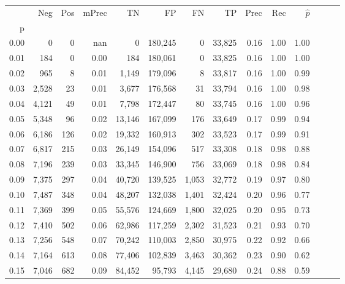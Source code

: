 \begin{tabular}{rrrrrrrrrrrrrr}
\toprule
{} &    Neg &  Pos & mPrec &       TN &       FP &      FN &      TP &  Prec &   Rec & $\hat{p}$ \\
p    &        &      &       &          &          &         &         &       &       &           \\
\midrule
0.00 &      0 &    0 &   nan &        0 &  180,245 &       0 &  33,825 &  0.16 &  1.00 &      1.00 \\
0.01 &    184 &    0 &  0.00 &      184 &  180,061 &       0 &  33,825 &  0.16 &  1.00 &      1.00 \\
0.02 &    965 &    8 &  0.01 &    1,149 &  179,096 &       8 &  33,817 &  0.16 &  1.00 &      0.99 \\
0.03 &  2,528 &   23 &  0.01 &    3,677 &  176,568 &      31 &  33,794 &  0.16 &  1.00 &      0.98 \\
0.04 &  4,121 &   49 &  0.01 &    7,798 &  172,447 &      80 &  33,745 &  0.16 &  1.00 &      0.96 \\
0.05 &  5,348 &   96 &  0.02 &   13,146 &  167,099 &     176 &  33,649 &  0.17 &  0.99 &      0.94 \\
0.06 &  6,186 &  126 &  0.02 &   19,332 &  160,913 &     302 &  33,523 &  0.17 &  0.99 &      0.91 \\
0.07 &  6,817 &  215 &  0.03 &   26,149 &  154,096 &     517 &  33,308 &  0.18 &  0.98 &      0.88 \\
0.08 &  7,196 &  239 &  0.03 &   33,345 &  146,900 &     756 &  33,069 &  0.18 &  0.98 &      0.84 \\
0.09 &  7,375 &  297 &  0.04 &   40,720 &  139,525 &   1,053 &  32,772 &  0.19 &  0.97 &      0.80 \\
0.10 &  7,487 &  348 &  0.04 &   48,207 &  132,038 &   1,401 &  32,424 &  0.20 &  0.96 &      0.77 \\
0.11 &  7,369 &  399 &  0.05 &   55,576 &  124,669 &   1,800 &  32,025 &  0.20 &  0.95 &      0.73 \\
0.12 &  7,410 &  502 &  0.06 &   62,986 &  117,259 &   2,302 &  31,523 &  0.21 &  0.93 &      0.70 \\
0.13 &  7,256 &  548 &  0.07 &   70,242 &  110,003 &   2,850 &  30,975 &  0.22 &  0.92 &      0.66 \\
0.14 &  7,164 &  613 &  0.08 &   77,406 &  102,839 &   3,463 &  30,362 &  0.23 &  0.90 &      0.62 \\
0.15 &  7,046 &  682 &  0.09 &   84,452 &   95,793 &   4,145 &  29,680 &  0.24 &  0.88 &      0.59 \\

\end{tabular}
